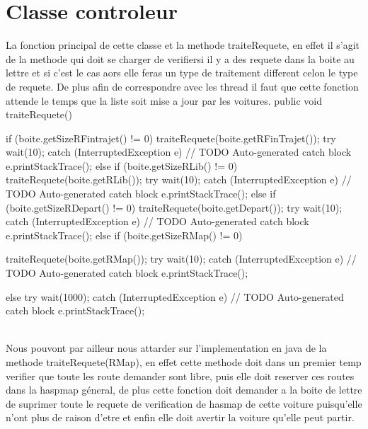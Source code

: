\documentclass[a4paper, titlepage]{report}
\begin{document}
\section{Classe controleur}
La fonction principal de cette classe et la methode traiteRequete, en effet il s'agit de la methode qui doit se charger de verifiersi il y a des requete dans la boite au lettre et si c'est le cas aors elle feras un type de traitement different celon le type de requete. De plus afin de correspondre avec les thread il faut que cette fonction attende le temps	que la liste soit mise a jour par les voitures.
public void traiteRequete() {
		if (boite.getSizeRFintrajet() != 0) {
			traiteRequete(boite.getRFinTrajet());
			try {
				wait(10);
			} catch (InterruptedException e) {
				// TODO Auto-generated catch block
				e.printStackTrace();
			}
		} else if (boite.getSizeRLib() != 0) {
			traiteRequete(boite.getRLib());
			try {
				wait(10);
			} catch (InterruptedException e) {
				// TODO Auto-generated catch block
				e.printStackTrace();
			}
		} else if (boite.getSizeRDepart() != 0) {
			traiteRequete(boite.getDepart());
			try {
				wait(10);
			} catch (InterruptedException e) {
				// TODO Auto-generated catch block
				e.printStackTrace();
			}
		} else if (boite.getSizeRMap() != 0) {
			traiteRequete(boite.getRMap());
			try {
				wait(10);
			} catch (InterruptedException e) {
				// TODO Auto-generated catch block
				e.printStackTrace();
			}

		} else {
			try {
				wait(1000);
			} catch (InterruptedException e) {
				// TODO Auto-generated catch block
				e.printStackTrace();
			}
		}

	}
\\
Nous pouvont par ailleur nous attarder sur l'implementation en java de la methode traiteRequete(RMap), en effet cette methode doit dans un premier temp verifier que toute les route demander sont libre, puis elle doit reserver ces routes dans la haspmap géneral, de plus cette fonction doit demander a la boite de lettre de suprimer toute le requete de verification de hasmap de cette voiture puisqu'elle n'ont plus de raison d'etre et enfin elle doit avertir la voiture qu'elle peut partir.	
\end{document}
